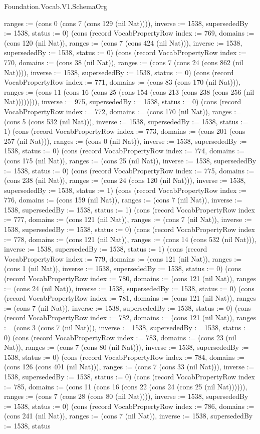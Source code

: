 \begin{lexlean}{Foundation.Vocab.V1.SchemaOrg}
\begin{semanticmodule}
{ranges := (cons 0 (cons 7 (cons 129 (nil Nat)))), inverse := 1538, supersededBy := 1538, status := 0}) (cons (record VocabPropertyRow {index := 769, domains := (cons 120 (nil Nat)), ranges := (cons 7 (cons 424 (nil Nat))), inverse := 1538, supersededBy := 1538, status := 0}) (cons (record VocabPropertyRow {index := 770, domains := (cons 38 (nil Nat)), ranges := (cons 7 (cons 24 (cons 862 (nil Nat)))), inverse := 1538, supersededBy := 1538, status := 0}) (cons (record VocabPropertyRow {index := 771, domains := (cons 83 (cons 170 (nil Nat))), ranges := (cons 11 (cons 16 (cons 25 (cons 154 (cons 213 (cons 238 (cons 256 (nil Nat)))))))), inverse := 975, supersededBy := 1538, status := 0}) (cons (record VocabPropertyRow {index := 772, domains := (cons 170 (nil Nat)), ranges := (cons 5 (cons 532 (nil Nat))), inverse := 1538, supersededBy := 1538, status := 1}) (cons (record VocabPropertyRow {index := 773, domains := (cons 201 (cons 257 (nil Nat))), ranges := (cons 0 (nil Nat)), inverse := 1538, supersededBy := 1538, status := 0}) (cons (record VocabPropertyRow {index := 774, domains := (cons 175 (nil Nat)), ranges := (cons 25 (nil Nat)), inverse := 1538, supersededBy := 1538, status := 0}) (cons (record VocabPropertyRow {index := 775, domains := (cons 238 (nil Nat)), ranges := (cons 24 (cons 120 (nil Nat))), inverse := 1538, supersededBy := 1538, status := 1}) (cons (record VocabPropertyRow {index := 776, domains := (cons 159 (nil Nat)), ranges := (cons 7 (nil Nat)), inverse := 1538, supersededBy := 1538, status := 1}) (cons (record VocabPropertyRow {index := 777, domains := (cons 121 (nil Nat)), ranges := (cons 7 (nil Nat)), inverse := 1538, supersededBy := 1538, status := 0}) (cons (record VocabPropertyRow {index := 778, domains := (cons 121 (nil Nat)), ranges := (cons 14 (cons 532 (nil Nat))), inverse := 1538, supersededBy := 1538, status := 1}) (cons (record VocabPropertyRow {index := 779, domains := (cons 121 (nil Nat)), ranges := (cons 1 (nil Nat)), inverse := 1538, supersededBy := 1538, status := 0}) (cons (record VocabPropertyRow {index := 780, domains := (cons 121 (nil Nat)), ranges := (cons 24 (nil Nat)), inverse := 1538, supersededBy := 1538, status := 0}) (cons (record VocabPropertyRow {index := 781, domains := (cons 121 (nil Nat)), ranges := (cons 7 (nil Nat)), inverse := 1538, supersededBy := 1538, status := 0}) (cons (record VocabPropertyRow {index := 782, domains := (cons 121 (nil Nat)), ranges := (cons 3 (cons 7 (nil Nat))), inverse := 1538, supersededBy := 1538, status := 0}) (cons (record VocabPropertyRow {index := 783, domains := (cons 23 (nil Nat)), ranges := (cons 7 (cons 80 (nil Nat))), inverse := 1538, supersededBy := 1538, status := 0}) (cons (record VocabPropertyRow {index := 784, domains := (cons 126 (cons 401 (nil Nat))), ranges := (cons 7 (cons 33 (nil Nat))), inverse := 1538, supersededBy := 1538, status := 0}) (cons (record VocabPropertyRow {index := 785, domains := (cons 11 (cons 16 (cons 22 (cons 24 (cons 25 (nil Nat)))))), ranges := (cons 7 (cons 28 (cons 80 (nil Nat)))), inverse := 1538, supersededBy := 1538, status := 0}) (cons (record VocabPropertyRow {index := 786, domains := (cons 241 (nil Nat)), ranges := (cons 7 (nil Nat)), inverse := 1538, supersededBy := 1538, status }
\end{semanticmodule}
\end{lexlean}
